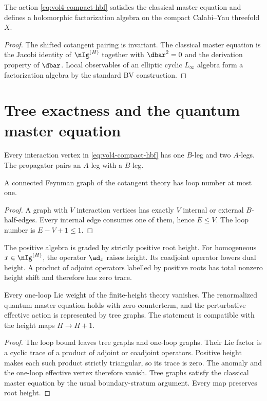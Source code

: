 \begin{theorem}
The action \eqref{eq:vol4-compact-hbf} satisfies the classical master equation and defines a holomorphic factorization algebra on the compact Calabi--Yau threefold $X$.
\end{theorem}
\begin{proof}
The shifted cotangent pairing is invariant.  The classical master equation is the Jacobi identity of $\nIg^{(H)}$ together with $\dbar^2=0$ and the derivation property of $\dbar$.  Local observables of an elliptic cyclic $L_\infty$ algebra form a factorization algebra by the standard BV construction.
\end{proof}

\chapter{Tree exactness and the quantum master equation}
Every interaction vertex in \eqref{eq:vol4-compact-hbf} has one $B$-leg and two $A$-legs.  The propagator pairs an $A$-leg with a $B$-leg.

\begin{lemma}
A connected Feynman graph of the cotangent theory has loop number at most one.
\end{lemma}
\begin{proof}
A graph with $V$ interaction vertices has exactly $V$ internal or external $B$-half-edges.  Every internal edge consumes one of them, hence $E\le V$.  The loop number is $E-V+1\le1$.
\end{proof}

The positive algebra is graded by strictly positive root height.  For homogeneous $x\in\nIg^{(H)}$, the operator $\ad_x$ raises height.  Its coadjoint operator lowers dual height.  A product of adjoint operators labelled by positive roots has total nonzero height shift and therefore has zero trace.

\begin{theorem}
Every one-loop Lie weight of the finite-height theory vanishes.  The renormalized quantum master equation holds with zero counterterm, and the perturbative effective action is represented by tree graphs.  The statement is compatible with the height maps $H\to H+1$.
\end{theorem}
\begin{proof}
The loop bound leaves tree graphs and one-loop graphs.  Their Lie factor is a cyclic trace of a product of adjoint or coadjoint operators.  Positive height makes each such product strictly triangular, so its trace is zero.  The anomaly and the one-loop effective vertex therefore vanish.  Tree graphs satisfy the classical master equation by the usual boundary-stratum argument.  Every map preserves root height.
\end{proof}

